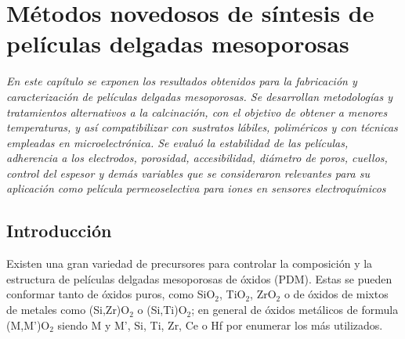  \newcommand{\NoBiblioMeso}[1]{
 \ifthenelse{\equal{#1}{verdadero}}{}{}
 \NoBiblioMeso{verdadero}}

 
 \FormatoCapituloDosLineas
 
 \chapter{Métodos novedosos de síntesis de películas delgadas mesoporosas}
 \label{chap:Mesoporosos}

 \thispagestyle{empty}
	
 \noindent\textit{En este capítulo se exponen los resultados obtenidos para la fabricación y caracterización de películas delgadas mesoporosas. Se desarrollan metodologías y tratamientos alternativos a la calcinación, con el objetivo de obtener \pdm\space a menores temperaturas, y así compatibilizar con sustratos lábiles, poliméricos y con técnicas empleadas en microelectrónica. Se evaluó la estabilidad de las películas, adherencia a los electrodos, porosidad, accesibilidad, diámetro de poros, cuellos, control del espesor y demás variables que se consideraron relevantes para su aplicación como película permeoselectiva para iones en sensores electroquímicos}
 
 \vfill
 \minitoc
 \newpage

\section{Introducción}

	Existen una gran variedad de precursores para controlar la composición y la estructura de películas delgadas mesoporosas de óxidos (PDM). Estas se pueden conformar tanto de óxidos puros, como SiO$_2$, TiO$_2$, ZrO$_2$ o de óxidos de mixtos de metales como (Si,Zr)O$_2$ o (Si,Ti)O$_2$; en general de óxidos metálicos de formula (M,M')O$_2$ siendo M y M', Si, Ti, Zr, Ce o Hf por enumerar los más utilizados.

